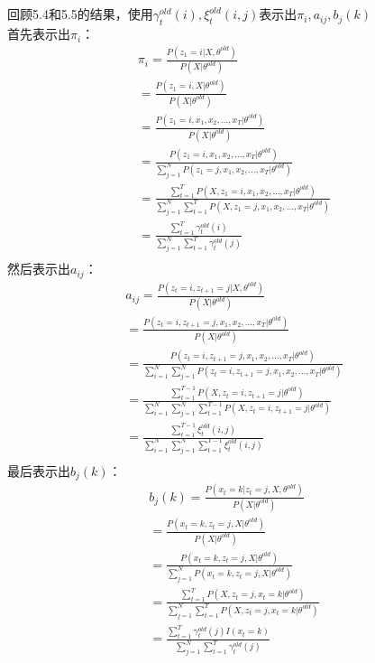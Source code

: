 \documentclass[12pt,a4paper]{article}
\begin{document}
\subsection{}
回顾5.4和5.5的结果，使用$\gamma_{t}^{old}(i),\xi_{t}^{old}(i,j)$表示出$\pi_i,a_{ij},b_j(k)$\\
首先表示出$\pi_i$：\\
\begin{gather*}
    \pi_i = \frac{P(z_1 = i|X,\theta^{old})}{P(X|\theta^{old})}\\
    = \frac{P(z_1 = i,X|\theta^{old})}{P(X|\theta^{old})}\\
    = \frac{P(z_1 = i,x_1,x_2,...,x_T|\theta^{old})}{P(X|\theta^{old})}\\
    = \frac{P(z_1 = i,x_1,x_2,...,x_T|\theta^{old})}{\sum_{j=1}^{N}P(z_1 = j,x_1,x_2,...,x_T|\theta^{old})}\\
    = \frac{\sum_{t=1}^{T}P(X,z_1 = i,x_1,x_2,...,x_T|\theta^{old})}{\sum_{j=1}^{N}\sum_{t=1}^{T}P(X,z_1 = j,x_1,x_2,...,x_T|\theta^{old})}\\
    = \frac{\sum_{t=1}^{T}\gamma_{t}^{old}(i)}{\sum_{j=1}^{N}\sum_{t=1}^{T}\gamma_{t}^{old}(j)}\\
\end{gather*}
然后表示出$a_{ij}$：\\
\begin{gather*}
    a_{ij} = \frac{P(z_t = i,z_{t+1} = j|X,\theta^{old})}{P(X|\theta^{old})}\\
    = \frac{P(z_t = i,z_{t+1} = j,x_1,x_2,...,x_T|\theta^{old})}{P(X|\theta^{old})}\\
    = \frac{P(z_t = i,z_{t+1} = j,x_1,x_2,...,x_T|\theta^{old})}{\sum_{i=1}^{N}\sum_{j=1}^{N}P(z_t = i,z_{t+1} = j,x_1,x_2,...,x_T|\theta^{old})}\\
    = \frac{\sum_{t=1}^{T-1}P(X,z_t = i,z_{t+1} = j|\theta^{old})}{\sum_{i=1}^{N}\sum_{j=1}^{N}\sum_{t=1}^{T-1}P(X,z_t = i,z_{t+1} = j|\theta^{old})}\\
    = \frac{\sum_{t=1}^{T-1}\xi_{t}^{old}(i,j)}{\sum_{i=1}^{N}\sum_{j=1}^{N}\sum_{t=1}^{T-1}\xi_{t}^{old}(i,j)}\\
\end{gather*}
最后表示出$b_j(k)$：\\
\begin{gather*}
    b_j(k) = \frac{P(x_t = k|z_t = j,X,\theta^{old})}{P(X|\theta^{old})}\\
    = \frac{P(x_t = k,z_t = j,X|\theta^{old})}{P(X|\theta^{old})}\\
    = \frac{P(x_t = k,z_t = j,X|\theta^{old})}{\sum_{j=1}^{N}P(x_t = k,z_t = j,X|\theta^{old})}\\
    = \frac{\sum_{t=1}^{T}P(X,z_t = j,x_t = k|\theta^{old})}{\sum_{j=1}^{N}\sum_{t=1}^{T}P(X,z_t = j,x_t = k|\theta^{old})}\\
    = \frac{\sum_{t=1}^{T}\gamma_{t}^{old}(j)I(x_t = k)}{\sum_{j=1}^{N}\sum_{t=1}^{T}\gamma_{t}^{old}(j)}\\
\end{gather*}
\end{document}
